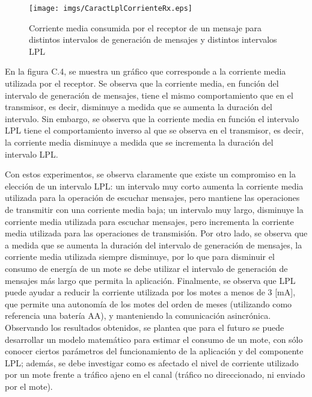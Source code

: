 \begin{figure}[H]
 \centering
\texttt{[image: imgs/CaractLplCorrienteRx.eps]}
\caption{Corriente media consumida por el receptor de un mensaje para distintos intervalos de generación de mensajes y distintos intervalos LPL}
\end{figure}

En la figura C.4, se muestra un gráfico que corresponde a la corriente media utilizada por el receptor. Se observa que la corriente media, en función  del intervalo de generación de mensajes, tiene el mismo comportamiento que en el transmisor, es decir, disminuye a medida que se aumenta la duración del intervalo. Sin embargo, se observa que la corriente media en función el intervalo LPL tiene el comportamiento inverso al que se observa en el transmisor, es decir, la corriente media disminuye a medida que se incrementa la duración del intervalo LPL.

Con estos experimentos, se observa claramente que existe un compromiso en la elección de un intervalo LPL: un intervalo muy corto aumenta la corriente media utilizada para la operación de escuchar mensajes, pero mantiene las operaciones de transmitir con una corriente media baja; un intervalo muy largo, disminuye la corriente media utilizada para escuchar mensajes, pero incrementa la corriente media utilizada para las operaciones de transmisión. Por otro lado, se observa que a medida que se aumenta la duración del intervalo de generación de mensajes, la corriente media utilizada siempre disminuye, por lo que para disminuir el consumo de energía de un mote se debe utilizar el intervalo de generación de mensajes más largo que permita la aplicación. Finalmente, se observa que LPL puede ayudar a reducir la corriente utilizada por los motes a menos de 3 [mA], que permite una autonomía de los motes del orden de meses (utilizando como referencia una batería AA), y manteniendo la comunicación asincrónica. Observando los resultados obtenidos, se plantea que para el futuro se puede desarrollar un modelo matemático para estimar el consumo de un mote, con sólo conocer ciertos parámetros del funcionamiento de la aplicación y del componente LPL; además, se debe investigar como es afectado el nivel de corriente utilizado por un mote frente a tráfico ajeno en el canal (tráfico no direccionado, ni enviado por el mote).